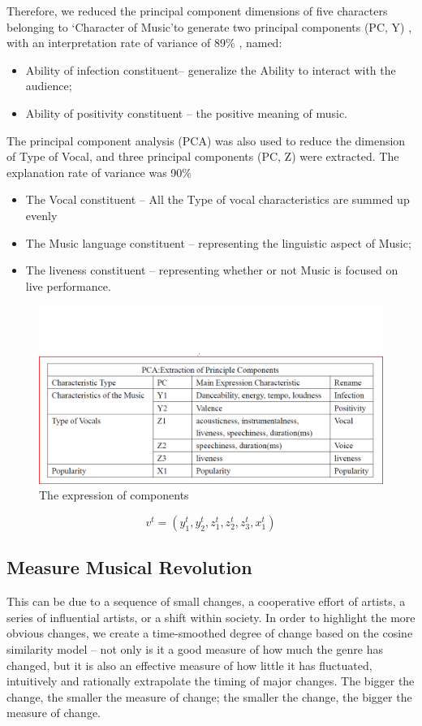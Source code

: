\documentclass[conference]{IEEEtran}
\begin{document}
Therefore, we reduced the principal component dimensions of five characters belonging to ‘Character of Music’to generate two principal components (PC, Y) , with an interpretation rate of variance of 89\% , named:
\begin{itemize}
	\item Ability of infection constituent-- generalize the Ability to interact with the audience;
	\item Ability of positivity constituent -- the positive meaning of music.
\end{itemize}
The principal component analysis (PCA) was also used to reduce the dimension of Type of Vocal, and three principal components (PC, Z) were extracted. The explanation rate of variance was 90\%
\begin{itemize}
	\item The Vocal constituent -- All the Type of vocal characteristics are summed up evenly
	\item The Music language constituent -- representing the linguistic aspect of Music;
	\item The liveness constituent -- representing whether or not Music is focused on live performance.
\end{itemize}

\begin{figure}[!htbp]
	\centering
	\includegraphics[width=.3\textwidth]{./img/table_of_component}
	\caption{The expression of components}\label{fig:table_of_component}
\end{figure}

\[v^{t}=(y_1^{t},y_2^{t},z_1^{t},z_2^{t},z_3^{t},x_1^{t})\]

\subsection{Measure Musical Revolution}
This can be due to a sequence of small changes, a cooperative effort of artists, a series of influential artists, or a shift within society. In order to highlight the more obvious changes, we create a time-smoothed degree of change based on the cosine similarity model -- not only is it a good measure of how much the genre has changed, but it is also an effective measure of how little it has fluctuated, intuitively and rationally extrapolate the timing of major changes. The bigger the change, the smaller the measure of change; the smaller the change, the bigger the measure of change.
\end{document}
